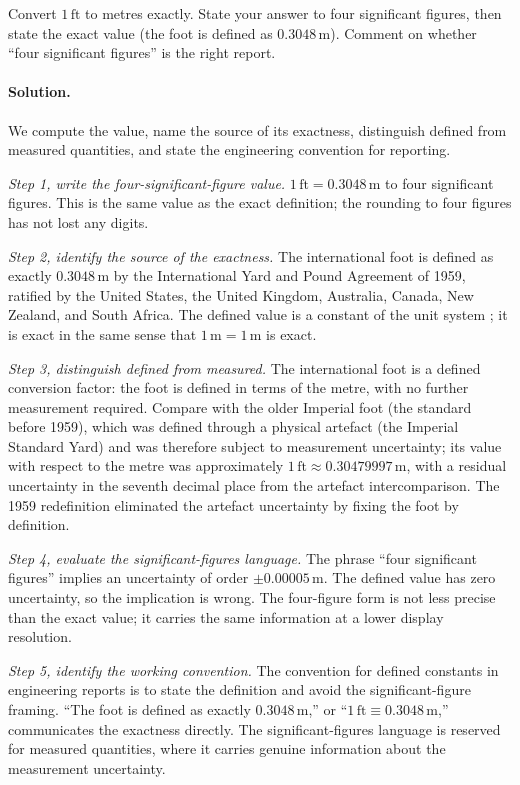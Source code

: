 \begin{exercise}
Convert $1\,\text{ft}$ to metres exactly. State your answer to four
significant figures, then state the exact value (the foot is defined
as $0.3048 \,\si{\meter}$). Comment on whether ``four significant
figures'' is the right report.

\paragraph{Solution.}
We compute the value, name the source of its exactness, distinguish
defined from measured quantities, and state the engineering
convention for reporting.

\textit{Step 1, write the four-significant-figure value.}
$1 \,\text{ft} = 0.3048 \,\si{\meter}$ to four significant figures.
This is the same value as the exact definition; the rounding to four
figures has not lost any digits.

\textit{Step 2, identify the source of the exactness.} The
international foot is defined as exactly $0.3048 \,\si{\meter}$ by the
International Yard and Pound Agreement of 1959, ratified by the
United States, the United Kingdom, Australia, Canada, New Zealand,
and South Africa. The defined value is a constant of the unit system
\cite{std:nist-sp811}; it is exact in the same sense that
$1 \,\si{\meter} = 1 \,\si{\meter}$ is exact.

\textit{Step 3, distinguish defined from measured.} The international
foot is a defined conversion factor: the foot is defined in terms of
the metre, with no further measurement required. Compare with the
older Imperial foot (the standard before 1959), which was defined
through a physical artefact (the Imperial Standard Yard) and was
therefore subject to measurement uncertainty; its value with respect
to the metre was approximately $1 \,\text{ft} \approx 0.30479997
\,\si{\meter}$, with a residual uncertainty in the seventh decimal
place from the artefact intercomparison. The 1959 redefinition
eliminated the artefact uncertainty by fixing the foot by definition.

\textit{Step 4, evaluate the significant-figures language.} The
phrase ``four significant figures'' implies an uncertainty of order
$\pm 0.00005 \,\si{\meter}$. The defined value has zero uncertainty,
so the implication is wrong. The four-figure form is not less
precise than the exact value; it carries the same information at a
lower display resolution.

\textit{Step 5, identify the working convention.} The convention for
defined constants in engineering reports is to state the definition
and avoid the significant-figure framing. ``The foot is defined as
exactly $0.3048 \,\si{\meter}$,'' or ``$1 \,\text{ft} \equiv 0.3048
\,\si{\meter}$,'' communicates the exactness directly. The
significant-figures language is reserved for measured quantities,
where it carries genuine information about the measurement
uncertainty.


\end{exercise}
